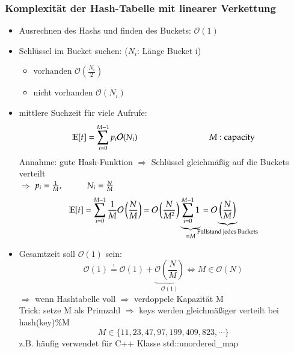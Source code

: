 \documentclass[11pt, fleqn]{scrreprt}
\newcommand{\bigO}[0]{\mathcal{O}}
\begin{document}
\subsubsection*{Komplexität der Hash-Tabelle mit linearer Verkettung}
\begin{itemize}
    \item Ausrechnen des Hashs und finden des Buckets: $\bigO{}(1)$
    \item Schlüssel im Bucket suchen: ($N_i$: Länge Bucket i)
    \begin{itemize}
        \item vorhanden $\bigO{}\left(\frac{N_i}{2}\right)$
        \item nicht vorhanden $\bigO{}(N_i)$
    \end{itemize}
    \item mittlere Suchzeit für viele Aufrufe:
    \[ \mathbb{E}[t] = \sum_{i=0}^{M-1} p_i\bigO{}(N_i) \hspace*{3cm} M : \text{capacity} \]
    Annahme: gute Hash-Funktion $\Rightarrow$ Schlüssel gleichmäßig auf die Buckets verteilt\\ $\Rightarrow$ $p_i = \frac{1}{M}, \hspace*{1cm} N_i = \frac{N}{M}$
    \[ \mathbb{E}[t] = \sum_{i=0}^{M-1} \frac{1}{M} \bigO{} \left(\frac{N}{M}\right) = \bigO{} \left(\frac{N}{M^2}\right) \underbrace{\sum_{i=0}^{M-1} 1}_{=M} = \bigO{} \hspace*{-9mm} \underbrace{\left(\frac{N}{M}\right)}_{\text{Füllstand jedes Buckets}}\]
    \item Gesamtzeit soll $\bigO{}(1)$ sein:
    \[ \bigO{}(1)  \stackrel{!}{=} \bigO{}(1) + \underbrace{\bigO{}\left(\frac{N}{M}\right)}_{\bigO{}(1)} \Leftrightarrow M \in \bigO{}(N)\]
$\Rightarrow$ wenn Hashtabelle voll $\Rightarrow$ verdoppele Kapazität M \\
Trick: setze M als Primzahl $\Rightarrow$ keys werden gleichmäßiger verteilt bei hash(key)\%M
\[ M \in \{11, 23, 47, 97, 199, 409, 823, \cdots\}\]
z.B. häufig verwendet für C++ Klasse std::unordered\_map
\end{itemize}
\end{document}
